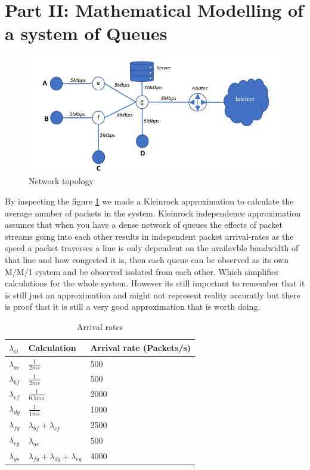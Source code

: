 \documentclass{article}
\begin{document}
\section{Part II: Mathematical Modelling of a system of Queues} \label{part2}
\begin{figure}[h!]
  \includegraphics[width=\linewidth]{netmap.png}
  \caption{Network topology}
  \label{fig:netmap}
\end{figure}
By inspecting the figure \ref{fig:netmap} we made a Kleinrock approximation to calculate the average number of 
packets in the system. Kleinrock independence approximation assumes that when you have a dense network of queues
the effects of packet streams going into each other results in independent packet arrival-rates as the speed a packet traverses a line is only dependent on the availavble bandwidth of that line and how congested it is, then each
queue can be observed as its own M/M/1 system and be observed isolated from each other. Which simplifies calculations
for the whole system. However its still important to remember that it is still just an approximation and might not
represent reality accuratly but there is proof that it is still a very good approximation that is worth doing. \cite{kenyon2002high}
\begin{table}[h]
\centering
\label{Arrivalrates}
\caption{Arrival rates}
\begin{tabular}{|l|l|l|}
\hline
$\lambda_{ij}$ & Calculation & Arrival rate (Packets/s) \\ \hline
$\lambda_{ae}$ & $\frac{1}{2ms}$  & 500 \\ \hline
$\lambda_{bf}$ & $\frac{1}{2ms}$  & 500 \\ \hline
$\lambda_{cf}$ & $\frac{1}{0.5ms}$  & 2000 \\ \hline
$\lambda_{dg}$ & $\frac{1}{1ms}$  & 1000 \\ \hline
$\lambda_{fg}$ & $\lambda_{bf} + \lambda_{cf}$  & 2500  \\ \hline
$\lambda_{eg}$ & $\lambda_{ae}$ & 500 \\ \hline
$\lambda_{gs}$ & $\lambda_{fg} + \lambda_{dg} + \lambda_{eg}$ & 4000 \\ \hline
\end{tabular}
\end{table}
\end{document}
